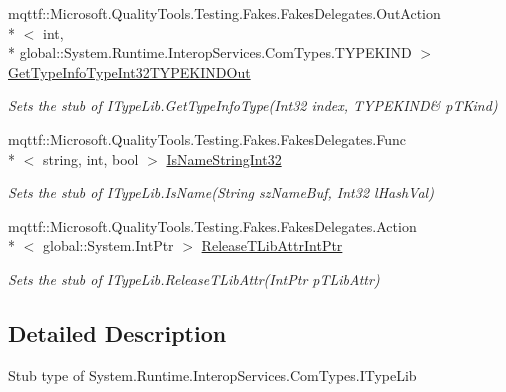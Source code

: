 \begin{DoxyCompactItemize}
mqttf\-::\-Microsoft.\-Quality\-Tools.\-Testing.\-Fakes.\-Fakes\-Delegates.\-Out\-Action\\*
$<$ int, \\*
global\-::\-System.\-Runtime.\-Interop\-Services.\-Com\-Types.\-T\-Y\-P\-E\-K\-I\-N\-D $>$ \hyperlink{class_system_1_1_runtime_1_1_interop_services_1_1_com_types_1_1_fakes_1_1_stub_i_type_lib_a513ec8c77d6a7c632a1a13e4b21d49e1}{Get\-Type\-Info\-Type\-Int32\-T\-Y\-P\-E\-K\-I\-N\-D\-Out}
\begin{DoxyCompactList}\small\item\em Sets the stub of I\-Type\-Lib.\-Get\-Type\-Info\-Type(Int32 index, T\-Y\-P\-E\-K\-I\-N\-D\& p\-T\-Kind)\end{DoxyCompactList}\item 
mqttf\-::\-Microsoft.\-Quality\-Tools.\-Testing.\-Fakes.\-Fakes\-Delegates.\-Func\\*
$<$ string, int, bool $>$ \hyperlink{class_system_1_1_runtime_1_1_interop_services_1_1_com_types_1_1_fakes_1_1_stub_i_type_lib_a684e70d09947bf0acb91653cfca3748e}{Is\-Name\-String\-Int32}
\begin{DoxyCompactList}\small\item\em Sets the stub of I\-Type\-Lib.\-Is\-Name(\-String sz\-Name\-Buf, Int32 l\-Hash\-Val)\end{DoxyCompactList}\item 
mqttf\-::\-Microsoft.\-Quality\-Tools.\-Testing.\-Fakes.\-Fakes\-Delegates.\-Action\\*
$<$ global\-::\-System.\-Int\-Ptr $>$ \hyperlink{class_system_1_1_runtime_1_1_interop_services_1_1_com_types_1_1_fakes_1_1_stub_i_type_lib_a2ecc6b37cc0929152228151013834f4c}{Release\-T\-Lib\-Attr\-Int\-Ptr}
\begin{DoxyCompactList}\small\item\em Sets the stub of I\-Type\-Lib.\-Release\-T\-Lib\-Attr(\-Int\-Ptr p\-T\-Lib\-Attr)\end{DoxyCompactList}\end{DoxyCompactItemize}


\subsection{Detailed Description}
Stub type of System.\-Runtime.\-Interop\-Services.\-Com\-Types.\-I\-Type\-Lib



